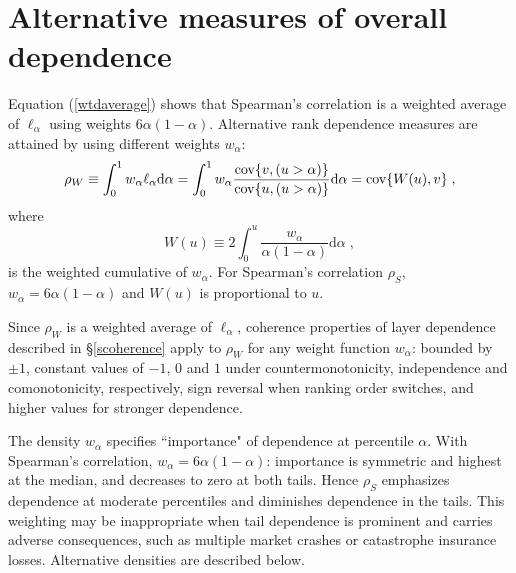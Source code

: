 \documentclass[authoryear]{elsarticle}
\newcommand{\cov}{{\rm cov}}
\newcommand{\de}{\mathrm{d}}
\newcommand{\eref}[1]{(\ref{#1})}
\newcommand{\sref}[1]{\S\ref{#1}}
\begin{document}
\section{Alternative measures of overall dependence}\label{saltoverall}


Equation \eref{wtdaverage} shows that Spearman's correlation is a weighted average of  $\ell_\alpha$ using weights $6\alpha(1-\alpha)$. Alternative rank dependence measures are attained  by using different weights $w_\alpha$:
$$
\rho_W\equiv  \int_0^1 w_\alpha \ell_\alpha \de \alpha = \int_0^1 w_\alpha \frac{ \cov\{v,(u>\alpha)\}}{\cov\{u,(u>\alpha)\}} \de \alpha=\cov\{W(u),v\} \;,
$$
where
$$
W(u)\equiv 2\int_0^u \frac{w_\alpha}{\alpha(1-\alpha)}\de\alpha \;,
$$
is the weighted cumulative of $w_\alpha$.  For Spearman's correlation $\rho_S$, $w_\alpha=6\alpha(1-\alpha)$ and $W(u)$ is proportional to $u$.

Since $\rho_W$ is a weighted average of $\ell_\alpha$, coherence properties of layer dependence described in \sref{scoherence} apply to $\rho_W$ for any weight function $w_\alpha$: bounded by $\pm 1$, constant values of $-1$, $0$ and $1$ under countermonotonicity, independence and comonotonicity, respectively, sign reversal when ranking order switches, and higher values for stronger dependence.

The density $w_\alpha$ specifies ``importance" of dependence at percentile $\alpha$. With Spearman's correlation, $w_\alpha=6\alpha(1-\alpha)$: importance is symmetric and highest at the median, and decreases to zero at both tails. Hence $\rho_S$ emphasizes dependence at moderate percentiles and diminishes dependence in the tails. This weighting may be inappropriate when tail dependence is prominent and carries adverse consequences, such as multiple market crashes or catastrophe insurance losses. Alternative densities are described below.
\end{document}
